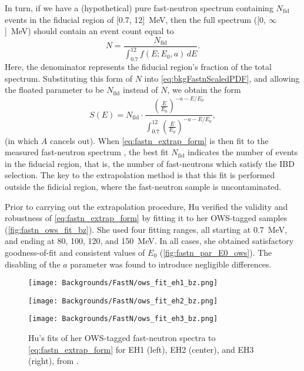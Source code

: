 \documentclass[../thesis.tex]{subfiles}
\begin{document}
In turn, if we have a (hypothetical) pure fast-neutron spectrum containing $N_\mathrm{fid}$ events in the fiducial region of [0.7, 12]~MeV, then the full spectrum ([0, $\infty$]~MeV) should contain an event count equal to
\begin{equation}
  N = \frac{N_\mathrm{fid}}{\int_{0.7}^{12} f(E; E_0, a)\,dE }.
\end{equation}
Here, the denominator represents the fiducial region's fraction of the total spectrum. Substituting this form of $N$ into \autoref{eq:bkgFastnScaledPDF}, and allowing the floated parameter to be $N_{\mathrm{fid}}$ instead of $N$, we obtain the form
\begin{equation}
  \label{eq:fastn_extrap_form}
  S(E) = N_\mathrm{fid} \cdot \frac{\left( \frac{E}{E_0} \right)^{-a-E/E_0}}
  {\int_{0.7}^{12} \left( \frac{E}{E_0} \right)^{-a-E/E_0} },
\end{equation}
(in which $A$ cancels out). When \autoref{eq:fastn_extrap_form} is then fit to the measured fast-neutron spectrum , the best fit $N_\mathrm{fid}$ indicates the number of events in the fiducial region, that is, the number of fast-neutrons which satisfy the IBD selection. The key to the extrapolation method is that this fit is performed outside the fidicial region, where the fast-neutron sample is uncontaminated.

Prior to carrying out the extrapolation procedure, Hu verified the validity and robustness of \eqref{eq:fastn_extrap_form} by fitting it to her OWS-tagged samples (\autoref{fig:fastn_ows_fit_bz}). She used four fitting ranges, all starting at 0.7~MeV, and ending at 80, 100, 120, and 150~MeV. In all cases, she obtained satisfactory goodness-of-fit and consistent values of $E_0$ (\autoref{fig:fastn_par_E0_ows}). The disabling of the $a$ parameter was found to introduce negligible differences.

\begin{figure}[ht]
  \begin{minipage}{0.333\textwidth}%
    \texttt{[image: Backgrounds/FastN/ows\_fit\_eh1\_bz.png]}%
  \end{minipage}%
  \begin{minipage}{0.333\textwidth}%
    \texttt{[image: Backgrounds/FastN/ows\_fit\_eh2\_bz.png]}%
  \end{minipage}%
  \begin{minipage}{0.333\textwidth}%
    \texttt{[image: Backgrounds/FastN/ows\_fit\_eh3\_bz.png]}%
  \end{minipage}%
  \caption{Hu's fits of her OWS-tagged fast-neutron spectra to \autoref{eq:fastn_extrap_form} for EH1 (left), EH2 (center), and EH3 (right), from \cite{fastn}.}
  \label{fig:fastn_ows_fit_bz}
\end{figure}
\end{document}
